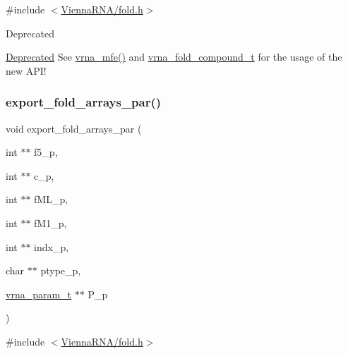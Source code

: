 {\ttfamily \#include $<$\hyperlink{fold_8h}{Vienna\+R\+N\+A/fold.\+h}$>$}

\begin{DoxyRefDesc}{Deprecated}
\item[\hyperlink{deprecated__deprecated000072}{Deprecated}]See \hyperlink{group__mfe__global_gabd3b147371ccf25c577f88bbbaf159fd}{vrna\+\_\+mfe()} and \hyperlink{group__fold__compound_ga1b0cef17fd40466cef5968eaeeff6166}{vrna\+\_\+fold\+\_\+compound\+\_\+t} for the usage of the new A\+P\+I!\end{DoxyRefDesc}
\mbox{\label{group__mfe__global__deprecated_ga6606ec0ec964ea506fdadb997a1a5328}} 
\subsubsection{\texorpdfstring{export\+\_\+fold\+\_\+arrays\+\_\+par()}{export\_fold\_arrays\_par()}}
{\footnotesize\ttfamily void export\+\_\+fold\+\_\+arrays\+\_\+par (\begin{DoxyParamCaption}\item[{int $\ast$$\ast$}]{f5\+\_\+p,  }\item[{int $\ast$$\ast$}]{c\+\_\+p,  }\item[{int $\ast$$\ast$}]{f\+M\+L\+\_\+p,  }\item[{int $\ast$$\ast$}]{f\+M1\+\_\+p,  }\item[{int $\ast$$\ast$}]{indx\+\_\+p,  }\item[{char $\ast$$\ast$}]{ptype\+\_\+p,  }\item[{\hyperlink{group__energy__parameters_ga8a69ca7d787e4fd6079914f5343a1f35}{vrna\+\_\+param\+\_\+t} $\ast$$\ast$}]{P\+\_\+p }\end{DoxyParamCaption})}



{\ttfamily \#include $<$\hyperlink{fold_8h}{Vienna\+R\+N\+A/fold.\+h}$>$}

